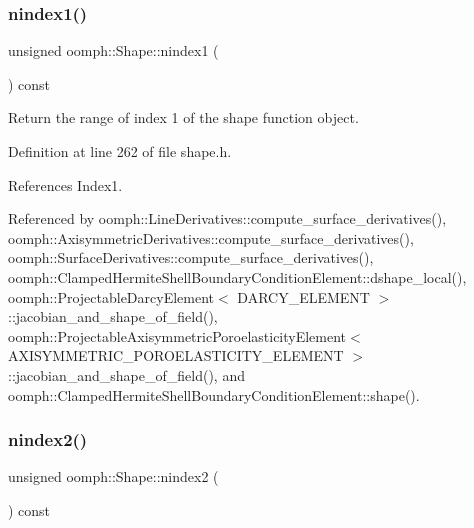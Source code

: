 \subsubsection{\texorpdfstring{nindex1()}{nindex1()}}
{\footnotesize\ttfamily unsigned oomph\+::\+Shape\+::nindex1 (\begin{DoxyParamCaption}{ }\end{DoxyParamCaption}) const\hspace{0.3cm}{\ttfamily [inline]}}



Return the range of index 1 of the shape function object. 



Definition at line 262 of file shape.\+h.



References Index1.



Referenced by oomph\+::\+Line\+Derivatives\+::compute\+\_\+surface\+\_\+derivatives(), oomph\+::\+Axisymmetric\+Derivatives\+::compute\+\_\+surface\+\_\+derivatives(), oomph\+::\+Surface\+Derivatives\+::compute\+\_\+surface\+\_\+derivatives(), oomph\+::\+Clamped\+Hermite\+Shell\+Boundary\+Condition\+Element\+::dshape\+\_\+local(), oomph\+::\+Projectable\+Darcy\+Element$<$ D\+A\+R\+C\+Y\+\_\+\+E\+L\+E\+M\+E\+N\+T $>$\+::jacobian\+\_\+and\+\_\+shape\+\_\+of\+\_\+field(), oomph\+::\+Projectable\+Axisymmetric\+Poroelasticity\+Element$<$ A\+X\+I\+S\+Y\+M\+M\+E\+T\+R\+I\+C\+\_\+\+P\+O\+R\+O\+E\+L\+A\+S\+T\+I\+C\+I\+T\+Y\+\_\+\+E\+L\+E\+M\+E\+N\+T $>$\+::jacobian\+\_\+and\+\_\+shape\+\_\+of\+\_\+field(), and oomph\+::\+Clamped\+Hermite\+Shell\+Boundary\+Condition\+Element\+::shape().

\mbox{\label{classoomph_1_1Shape_ae5be285b7233935366b561646a085463}} 
\subsubsection{\texorpdfstring{nindex2()}{nindex2()}}
{\footnotesize\ttfamily unsigned oomph\+::\+Shape\+::nindex2 (\begin{DoxyParamCaption}{ }\end{DoxyParamCaption}) const\hspace{0.3cm}{\ttfamily [inline]}}



